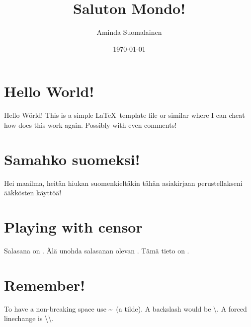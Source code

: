 \documentclass[a4paper,12pt]{artikel3}
\title{Saluton Mondo!}
\author{Aminda Suomalainen}
\date{\today}
\begin{document}
\maketitle


\section*{Hello World!}

Hello Wörld! This is a simple \LaTeX\ template file or similar where I can
cheat how does this work again. Possibly with even comments!


\section*{Samahko suomeksi!}

Hei maailma, heitän hiukan suomenkieltäkin tähän asiakirjaan perustellakseni
ääkkösten käyttöä!


\section*{Playing with censor}


\def \Password{\censor*{8}}
\def \Huippusalainen{\censor*{14}}

Salasana on \Password. Älä unohda salasanan olevan \Password. Tämä tieto on \Huippusalainen.


\section*{Remember!}

To have a non-breaking space use \textasciitilde\ (a tilde). A backslash would be \textbackslash. A forced linechange is \textbackslash\textbackslash.

\end{document}

